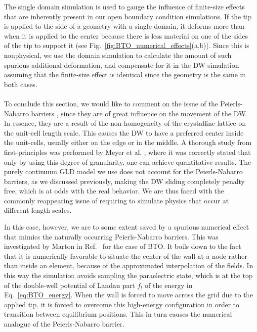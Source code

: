 The single domain simulation is used to gauge the influence of finite-size effects that are inherently present in our open boundary condition simulations.
If the tip is applied to the side of a geometry with a single domain, it deforms more than when it is applied to the center because there is less material on one of the sides of the tip to support it (see Fig.~\ref{fig:BTO_numerical_effects}(a,b)).
Since this is nonphysical, we use the domain simulation to calculate the amount of such spurious additional deformation, and compensate for it in the DW simulation assuming that the finite-size effect is identical since the geometry is the same in both cases.
\\\\
To conclude this section, we would like to comment on the issue of the Peierls-Nabarro barriers \cite{Peierls1940,Nabarro1947}, since they are of great influence on the movement of the DW.
In essence, they are a result of the non-homogeneity of the crystalline lattice on the unit-cell length scale.
This causes the DW to have a preferred center inside the unit-cells, usually either on the edge or in the middle.
A thorough study from first-principles was performed by Meyer et al. \cite{Meyer2002}, where it was correctly stated that only by using this degree of granularity, one can achieve quantitative results.
The purely continuum GLD model we use does not account for the Peierls-Nabarro barriers, as we discussed previously, making the DW sliding completely penalty free, which is at odds with the real behavior.
We are thus faced with the commonly reappearing issue of requiring to simulate physics that occur at different length scales.

In this case, however, we are to some extent saved by a spurious numerical effect that mimics the naturally occurring Peierls-Nabarro barriers.
This was investigated by Marton in Ref.~\cite{Marton2018} for the case of BTO.
It boils down to the fact that it is numerically favorable to situate the center of the wall at a node rather than inside an element, because of the approximated interpolation of the fields.
In this way the simulation avoids sampling the paraelectric state, which is at the top of the double-well potential of Landau part $f_l$ of the energy in Eq.~\eqref{eq:BTO_energy}.
When the wall is forced to move across the grid due to the applied tip, it is forced to overcome this high-energy configuration in order to transition between equilibrium positions.
This in turn causes the numerical analogue of the Peierls-Nabarro barrier.

